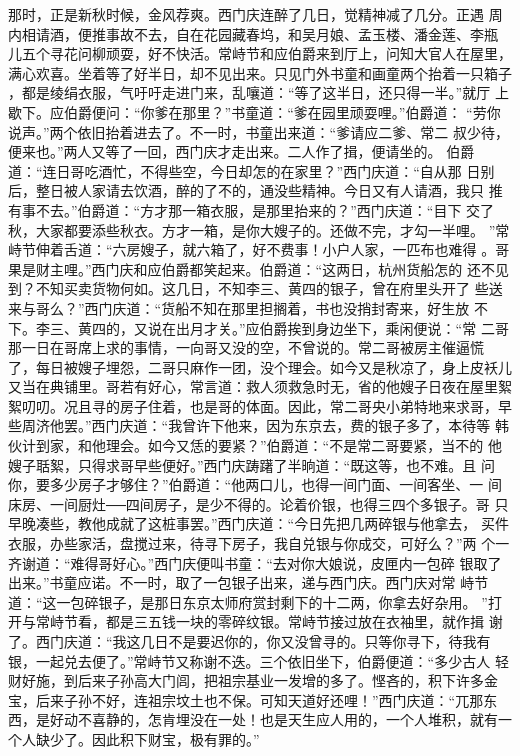 那时，正是新秋时候，金风荐爽。西门庆连醉了几日，觉精神减了几分。正遇
周内相请酒，便推事故不去，自在花园藏春坞，和吴月娘、孟玉楼、潘金莲、李瓶
儿五个寻花问柳顽耍，好不快活。常峙节和应伯爵来到厅上，问知大官人在屋里，
满心欢喜。坐着等了好半日，却不见出来。只见门外书童和画童两个抬着一只箱子
，都是绫绢衣服，气吁吁走进门来，乱嚷道：“等了这半日，还只得一半。”就厅
上歇下。应伯爵便问：“你爹在那里？”书童道：“爹在园里顽耍哩。”伯爵道：
“劳你说声。”两个依旧抬着进去了。不一时，书童出来道：“爹请应二爹、常二
叔少待，便来也。”两人又等了一回，西门庆才走出来。二人作了揖，便请坐的。
伯爵道：“连日哥吃酒忙，不得些空，今日却怎的在家里？”西门庆道：“自从那
日别后，整日被人家请去饮酒，醉的了不的，通没些精神。今日又有人请酒，我只
推有事不去。”伯爵道：“方才那一箱衣服，是那里抬来的？”西门庆道：“目下
交了秋，大家都要添些秋衣。方才一箱，是你大嫂子的。还做不完，才勾一半哩。
”常峙节伸着舌道：“六房嫂子，就六箱了，好不费事！小户人家，一匹布也难得
。哥果是财主哩。”西门庆和应伯爵都笑起来。伯爵道：“这两日，杭州货船怎的
还不见到？不知买卖货物何如。这几日，不知李三、黄四的银子，曾在府里头开了
些送来与哥么？”西门庆道：“货船不知在那里担搁着，书也没捎封寄来，好生放
不下。李三、黄四的，又说在出月才关。”应伯爵挨到身边坐下，乘闲便说：“常
二哥那一日在哥席上求的事情，一向哥又没的空，不曾说的。常二哥被房主催逼慌
了，每日被嫂子埋怨，二哥只麻作一团，没个理会。如今又是秋凉了，身上皮袄儿
又当在典铺里。哥若有好心，常言道：救人须救急时无，省的他嫂子日夜在屋里絮
絮叨叨。况且寻的房子住着，也是哥的体面。因此，常二哥央小弟特地来求哥，早
些周济他罢。”西门庆道：“我曾许下他来，因为东京去，费的银子多了，本待等
韩伙计到家，和他理会。如今又恁的要紧？”伯爵道：“不是常二哥要紧，当不的
他嫂子聒絮，只得求哥早些便好。”西门庆踌躇了半晌道：“既这等，也不难。且
问你，要多少房子才够住？”伯爵道：“他两口儿，也得一间门面、一间客坐、一
间床房、一间厨灶──四间房子，是少不得的。论着价银，也得三四个多银子。哥
只早晚凑些，教他成就了这桩事罢。”西门庆道：“今日先把几两碎银与他拿去，
买件衣服，办些家活，盘搅过来，待寻下房子，我自兑银与你成交，可好么？”两
个一齐谢道：“难得哥好心。”西门庆便叫书童：“去对你大娘说，皮匣内一包碎
银取了出来。”书童应诺。不一时，取了一包银子出来，递与西门庆。西门庆对常
峙节道：“这一包碎银子，是那日东京太师府赏封剩下的十二两，你拿去好杂用。
”打开与常峙节看，都是三五钱一块的零碎纹银。常峙节接过放在衣袖里，就作揖
谢了。西门庆道：“我这几日不是要迟你的，你又没曾寻的。只等你寻下，待我有
银，一起兑去便了。”常峙节又称谢不迭。三个依旧坐下，伯爵便道：“多少古人
轻财好施，到后来子孙高大门闾，把祖宗基业一发增的多了。悭吝的，积下许多金
宝，后来子孙不好，连祖宗坟土也不保。可知天道好还哩！”西门庆道：“兀那东
西，是好动不喜静的，怎肯埋没在一处！也是天生应人用的，一个人堆积，就有一
个人缺少了。因此积下财宝，极有罪的。”

